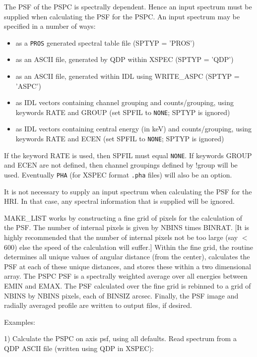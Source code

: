 The PSF of the PSPC is spectrally dependent. Hence an input spectrum must be
supplied when calculating the PSF for the PSPC. An input spectrum may be
specified in a number of ways:

\begin{itemize}
\item  as a {\tt PROS} generated spectral table file (SPTYP = 'PROS')
\item  as an ASCII file, generated by QDP within XSPEC (SPTYP = 'QDP')
\item  as an ASCII file, generated within IDL using WRITE{\_}ASPC (SPTYP = 'ASPC')
\item  as IDL vectors containing channel grouping and counts/grouping, using
   keywords RATE and GROUP (set SPFIL to {\tt NONE}; SPTYP is ignored)
\item  as IDL vectors containing central energy (in keV) and counts/grouping,
   using keywords RATE and ECEN (set SPFIL to {\tt NONE}; SPTYP is ignored)
\end{itemize}
If the keyword RATE is used, then SPFIL must equal {\tt NONE}. If keywords GROUP
and ECEN are not defined, then channel groupings defined by !group will be
used. Eventually {\tt PHA} (for XSPEC format {\tt .pha} files) will also be an option.
 
It is not necessary to supply an input spectrum when calculating the PSF
for the HRI. In that case, any spectral information that is supplied will
be ignored.
 
MAKE{\_}LIST works by constructing a fine grid of pixels for the calculation of
the PSF. The number of internal pixels is given by NBINS times BINRAT. [It is
highly recommended that the number of internal pixels not be too large (say $<$
600) else the speed of the calculation will suffer.] Within the fine grid, the
routine determines all unique values of angular distance (from the center),
calculates the PSF at each of these unique distances, and stores these within a
two dimensional array. The PSPC PSF is a spectrally weighted average over all
energies between EMIN and EMAX. The PSF calculated over the fine grid is
rebinned to a grid of NBINS by NBINS pixels, each of BINSIZ arcsec. Finally,
the PSF image and radially averaged profile are written to output files, if
desired.
 
Examples:
 
1) Calculate the PSPC on axis psf, using all defaults. Read spectrum from
a QDP ASCII file (written using QDP in XSPEC):

